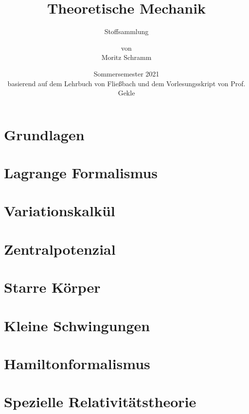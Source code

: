 \documentclass[a4paper, 12pt]{report}
\institute{Universität Bayreuth}
\title{Theoretische Mechanik}
\subtitle{Stoffsammlung}
\author{von\\Moritz Schramm}%
\date{Sommersemester 2021\\ \small basierend auf dem Lehrbuch von Fließbach und dem Vorlesungsskript von Prof. Gekle}
\begin{document}
    \maketitle
    \romantableofcontents

    \chapter{Grundlagen}
    
    
    \chapter{Lagrange Formalismus}
    
    
	\chapter{Variationskalkül}
	
	
	\chapter{Zentralpotenzial}
	
	
	\chapter{Starre Körper}
	
	
	\chapter{Kleine Schwingungen}
	
	
	\chapter{Hamiltonformalismus}
	
	
	\chapter{Spezielle Relativitätstheorie}
	
\end{document}
